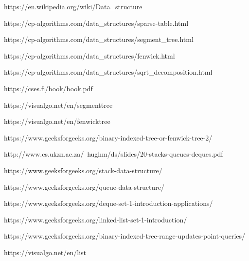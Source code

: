 \documentclass[12pt]{article}
\begin{document}
    \begin{thebibliography}{2}
    
    
    https://en.wikipedia.org/wiki/Data\_structure    

    https://cp-algorithms.com/data\_structures/sparse-table.html

    https://cp-algorithms.com/data\_structures/segment\_tree.html
    
    https://cp-algorithms.com/data\_structures/fenwick.html
  
    https://cp-algorithms.com/data\_structures/sqrt\_decomposition.html
    
    https://cses.fi/book/book.pdf
    
    https://visualgo.net/en/segmenttree
    
    https://visualgo.net/en/fenwicktree
    

    https://www.geeksforgeeks.org/binary-indexed-tree-or-fenwick-tree-2/
    
    
    http://www.cs.ukzn.ac.za/~hughm/ds/slides/20-stacks-queues-deques.pdf
    
    
    https://www.geeksforgeeks.org/stack-data-structure/    
    
    
    https://www.geeksforgeeks.org/queue-data-structure/
    
    
    https://www.geeksforgeeks.org/deque-set-1-introduction-applications/    
    
    
    https://www.geeksforgeeks.org/linked-list-set-1-introduction/
    
    
    https://www.geeksforgeeks.org/binary-indexed-tree-range-updates-point-queries/
    
    
    https://visualgo.net/en/list    
    
    \end{thebibliography} 

 
\end{document}
